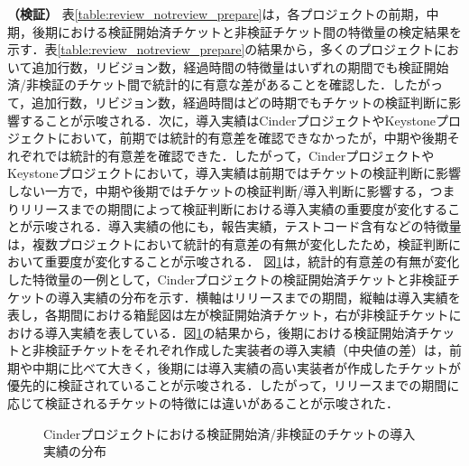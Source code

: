 \documentclass[11pt]{jreport}
\begin{document}
\textbf{（検証）} 表\ref{table:review_notreview_prepare}は，各プロジェクトの前期，中期，後期における検証開始済チケットと非検証チケット間の特徴量の検定結果を示す．表\ref{table:review_notreview_prepare}の結果から，多くのプロジェクトにおいて追加行数，リビジョン数，経過時間の特徴量はいずれの期間でも検証開始済/非検証のチケット間で統計的に有意な差があることを確認した．したがって，追加行数，リビジョン数，経過時間はどの時期でもチケットの検証判断に影響することが示唆される．次に，導入実績はCinderプロジェクトやKeystoneプロジェクトにおいて，前期では統計的有意差を確認できなかったが，中期や後期それぞれでは統計的有意差を確認できた．したがって，CinderプロジェクトやKeystoneプロジェクトにおいて，導入実績は前期ではチケットの検証判断に影響しない一方で，中期や後期ではチケットの検証判断/導入判断に影響する，つまりリリースまでの期間によって検証判断における導入実績の重要度が変化することが示唆される．導入実績の他にも，報告実績，テストコード含有などの特徴量は，複数プロジェクトにおいて統計的有意差の有無が変化したため，検証判断において重要度が変化することが示唆される．
図\ref{fig:review_notreview}は，統計的有意差の有無が変化した特徴量の一例として，Cinderプロジェクトの検証開始済チケットと非検証チケットの導入実績の分布を示す．横軸はリリースまでの期間，縦軸は導入実績を表し，各期間における箱髭図は左が検証開始済チケット，右が非検証チケットにおける導入実績を表している．図\ref{fig:review_notreview}の結果から，後期における検証開始済チケットと非検証チケットをそれぞれ作成した実装者の導入実績（中央値の差）は，前期や中期に比べて大きく，後期には導入実績の高い実装者が作成したチケットが優先的に検証されていることが示唆される．したがって，リリースまでの期間に応じて検証されるチケットの特徴には違いがあることが示唆された．


\begin{figure}[h]
\begin{center}
\caption{Cinderプロジェクトにおける検証開始済/非検証のチケットの導入実績の分布}
\label{fig:review_notreview}
\end{center}
\end{figure}
\end{document}
